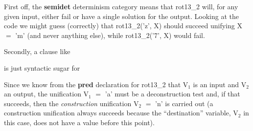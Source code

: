 \documentclass[a4paper,11pt,notitlepage,onecolumn]{book}
\begin{document}
First off, the \textsf{\textbf{semidet}} determinism category means that \textsf{rot13\_2} will, for
any given input, either fail or have a single solution for the output.
Looking at the
code we might guess (correctly) that \textsf{rot13\_2('z', X)} should succeed
unifying \textsf{X {\ensuremath{=}} 'm'} (and never anything else), while \textsf{rot13\_2('7', X)}
would fail.

Secondly, a clause like
\begin{small}

\begin{ptabular}
\nextline
\end{ptabular}

\end{small}
is just syntactic sugar for
\begin{small}

\begin{ptabular}
\nextline
\end{ptabular}

\end{small}
Since we know from the \textsf{\textbf{pred}} declaration for \textsf{rot13\_2} that \textsf{V$_{1}$} is an
input and \textsf{V$_{2}$} an output, the unification \textsf{V$_{1}$ {\ensuremath{=}} 'a'} must be a
deconstruction test and, if that succeeds, then the \emph{construction}
unification \textsf{V$_{2}$ {\ensuremath{=}} 'n'} is carried out (a construction unification always
succeeds because the ``destination'' variable, \textsf{V$_{2}$} in this case, does not
have a value before this point).
\end{document}
